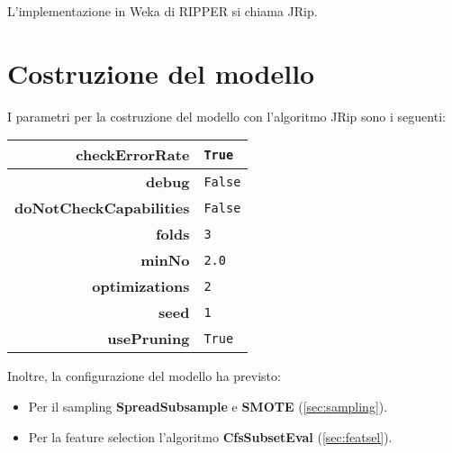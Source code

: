 L'implementazione in Weka di RIPPER si chiama JRip.

\section{Costruzione del modello}
I parametri per la costruzione del modello con l'algoritmo JRip sono i seguenti:
\begin{center}
	\begin{tabular}{|r|l|}
		\hline
		\textbf{checkErrorRate} & \texttt{True} \\ \hline
		\textbf{debug} & \texttt{False} \\ \hline
		\textbf{doNotCheckCapabilities} & \texttt{False} \\ \hline
		\textbf{folds} & \texttt{3} \\ \hline
		\textbf{minNo} & \texttt{2.0} \\ \hline
		\textbf{optimizations} & \texttt{2} \\ \hline
		\textbf{seed} & \texttt{1} \\ \hline
		\textbf{usePruning} & \texttt{True} \\ \hline
	\end{tabular}
\end{center}

Inoltre, la configurazione del modello ha previsto:
\begin{itemize}
	\item Per il sampling \textbf{SpreadSubsample} e \textbf{SMOTE} (\ref{sec:sampling}).
	\item Per la feature selection l'algoritmo \textbf{CfsSubsetEval} (\ref{sec:featsel}).
\end{itemize}

